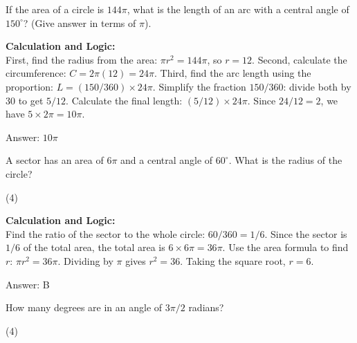 \documentclass[11pt,paper=a4,answers]{exam}
\begin{document}
\begin{questions}
\question
If the area of a circle is $144\pi$, what is the length of an arc with a central angle of $150^\circ$? (Give answer in terms of $\pi$).

\begin{solution}
\textbf{Calculation and Logic:} \\
First, find the radius from the area: $\pi r^2 = 144\pi$, so $r = 12$. Second, calculate the circumference: $C = 2\pi(12) = 24\pi$. Third, find the arc length using the proportion: $L = (150 / 360) \times 24\pi$. Simplify the fraction $150/360$: divide both by 30 to get $5/12$. Calculate the final length: $(5/12) \times 24\pi$. Since $24/12 = 2$, we have $5 \times 2\pi = 10\pi$.

\vspace{30pt}

Answer: \colorbox{yellow!100}{$10\pi$}
\end{solution}

\vspace{60pt}

\question
A sector has an area of $6\pi$ and a central angle of $60^\circ$. What is the radius of the circle?
\begin{tasks}(4)
\end{tasks}

\begin{solution}
\textbf{Calculation and Logic:} \\
Find the ratio of the sector to the whole circle: $60 / 360 = 1 / 6$. Since the sector is $1/6$ of the total area, the total area is $6 \times 6\pi = 36\pi$. Use the area formula to find $r$: $\pi r^2 = 36\pi$. Dividing by $\pi$ gives $r^2 = 36$. Taking the square root, $r = 6$.

\vspace{30pt}

Answer: \colorbox{yellow!100}{B}
\end{solution}

\vspace{60pt}

\question
How many degrees are in an angle of $3\pi / 2$ radians?
\begin{tasks}(4)
\end{tasks}


\end{questions}
\end{document}
